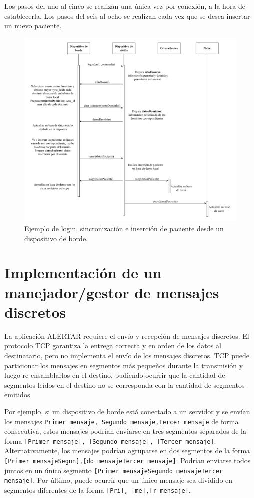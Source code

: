 Los pasos del uno al cinco se realizan una única vez por conexión, a la hora de establecerla. Los pasos del seis al ocho se realizan cada vez que se desea insertar un nuevo paciente.

\begin{figure}
    \centering
    \includegraphics[width=\linewidth]{Imagenes/Implementacion/secuenciaProtocolo.pdf}
    \caption{Ejemplo de login, sincronización e inserción de paciente desde un dispositivo de borde.}
    \label{fig:secuenciaProtocolo}
\end{figure}

\section{Implementación de un manejador/gestor de mensajes discretos}
\label{sec:packageManager}
La aplicación ALERTAR requiere el envío y recepción de mensajes discretos. El protocolo TCP garantiza la entrega correcta y en orden de los datos al destinatario, pero no implementa el envío de los mensajes discretos. TCP puede particionar los mensajes en segmentos más pequeños durante la transmisión y luego re-ensamblarlos en el destino, pudiendo ocurrir que la cantidad de segmentos leídos en el destino no se corresponda con la cantidad de segmentos emitidos.

Por ejemplo, si un dispositivo de borde está conectado a un servidor y se envían los mensajes \texttt{Primer mensaje, Segundo mensaje,Tercer mensaje} de forma consecutiva, estos mensajes podrían enviarse en tres segmentos separados de la forma \texttt{[Primer mensaje], [Segundo mensaje], [Tercer mensaje]}. Alternativamente, los mensajes podrían agruparse en dos segmentos de la forma \texttt{[Primer mensajeSegun],[do mensajeTercer mensaje]}. Podrían enviarse todos juntos en un único segmento \texttt{[Primer mensaje\allowbreak Segundo mensaje\break Tercer mensaje]}. Por último, puede ocurrir que un único mensaje sea dividido en segmentos diferentes de la forma \texttt{[Pri], [me],[r mensaje]}.

